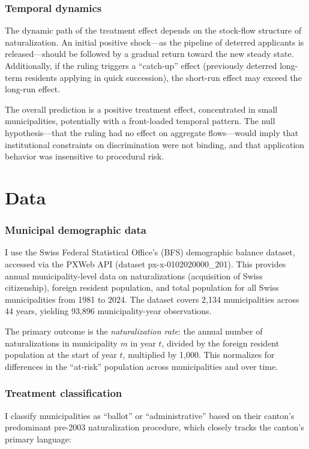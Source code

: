 \documentclass[12pt]{article}
\begin{document}
\subsubsection*{Temporal dynamics} The dynamic path of the treatment effect depends on the stock-flow structure of naturalization. An initial positive shock---as the pipeline of deterred applicants is released---should be followed by a gradual return toward the new steady state. Additionally, if the ruling triggers a ``catch-up'' effect (previously deterred long-term residents applying in quick succession), the short-run effect may exceed the long-run effect.

The overall prediction is a positive treatment effect, concentrated in small municipalities, potentially with a front-loaded temporal pattern. The null hypothesis---that the ruling had no effect on aggregate flows---would imply that institutional constraints on discrimination were not binding, and that application behavior was insensitive to procedural risk.


\section{Data}\label{sec:data}

\subsubsection*{Municipal demographic data} I use the Swiss Federal Statistical Office's (BFS) demographic balance dataset, accessed via the PXWeb API (dataset px-x-0102020000\_201). This provides annual municipality-level data on naturalizations (acquisition of Swiss citizenship), foreign resident population, and total population for all Swiss municipalities from 1981 to 2024. The dataset covers 2,134 municipalities across 44 years, yielding 93,896 municipality-year observations.

The primary outcome is the \textit{naturalization rate}: the annual number of naturalizations in municipality $m$ in year $t$, divided by the foreign resident population at the start of year $t$, multiplied by 1,000. This normalizes for differences in the ``at-risk'' population across municipalities and over time.

\subsubsection*{Treatment classification} I classify municipalities as ``ballot'' or ``administrative'' based on their canton's predominant pre-2003 naturalization procedure, which closely tracks the canton's primary language:
\end{document}
